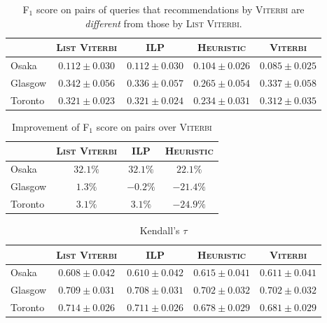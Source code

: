 \begin{table*}[!t]
\label{tab:pf1-diff}
\caption{F$_1$ score on pairs of queries that recommendations by \textsc{Viterbi} are \emph{different} from those by \textsc{List Viterbi}.}
\centering
\begin{tabular}{l|ccc|c} \hline
 & \textsc{List Viterbi} & \textsc{ILP} & \textsc{Heuristic} & \textsc{Viterbi} \\ \hline
Osaka & $0.112\pm0.030$ & $0.112\pm0.030$ & $0.104\pm0.026$ & $0.085\pm0.025$ \\
Glasgow & $0.342\pm0.056$ & $0.336\pm0.057$ & $0.265\pm0.054$ & $0.337\pm0.058$ \\
Toronto & $0.321\pm0.023$ & $0.321\pm0.024$ & $0.234\pm0.031$ & $0.312\pm0.035$ \\
\hline
\end{tabular}
\end{table*}

\begin{table*}[!t]
\caption{Improvement of F$_1$ score on pairs over \textsc{Viterbi}}
\label{tab:pf1-up}
\centering
\begin{tabular}{l|ccc} \hline
 & \textsc{List Viterbi} & \textsc{ILP} & \textsc{Heuristic} \\ \hline
Osaka & $32.1\%$ & $32.1\%$ & $22.1\%$ \\
Glasgow & $1.3\%$ & $-0.2\%$ & $-21.4\%$ \\
Toronto & $3.1\%$ & $3.1\%$ & $-24.9\%$ \\
\hline
\end{tabular}
\end{table*}


\begin{table*}[!t]
\label{tab:tau}
\caption{Kendall's $\tau$}
\centering
\begin{tabular}{l|ccc|c} \hline
 & \textsc{List Viterbi} & \textsc{ILP} & \textsc{Heuristic} & \textsc{Viterbi} \\ \hline
Osaka & $0.608\pm0.042$ & $0.610\pm0.042$ & $0.615\pm0.041$ & $0.611\pm0.041$ \\
Glasgow & $0.709\pm0.031$ & $0.708\pm0.031$ & $0.702\pm0.032$ & $0.702\pm0.032$ \\
Toronto & $0.714\pm0.026$ & $0.711\pm0.026$ & $0.678\pm0.029$ & $0.681\pm0.029$ \\
\hline
\end{tabular}
\end{table*}

